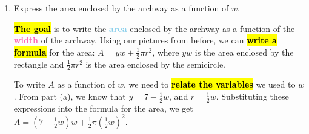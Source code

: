 \documentclass{article}
\newcommand{\goal}[1]{\textbf{\textcolor{skyblue}{#1}}}
\newcommand{\indvar}[1]{\textbf{\textcolor{hotpink}{#1}}}
\begin{document}
\begin{enumerate}
\begin{enumerate}
\begin{solution}
      Now let's \hl{\textbf{write a formula}} for the height of the side wall, \hl{\textbf{defining any variables we use.}}
       \begin{center}
      \end{center}
     Let's use $r$ to represent the height from the bottom of the semicircle to the top of the semicircle and $h$
     to represent the total height of the archway. Then $y=h-r$. 
     
     To write $y$ as a function of $w$, we need to \hl{\textbf{relate the variables}} using \hl{\textbf{information we know}} about the situation. We know that the
     total height of the archway is 7 meters, so $h=7$. Also, we can see that $r$ is the radius of the semicircle
     and $w$ is the diameter, which means that $r=\frac{1}{2}w$. We can substitute these expressions for $h$ and $r$
     to get $y=\boxed{7-\frac{1}{2}w}$. 
    \end{solution}

    

    

  \item
    \begin{problem}[\vfill]
      Express the area enclosed by the archway as a function of $w$.
    \end{problem}

    \begin{solution}
      \hl{\textbf{The goal}} is to write the \goal{area} enclosed by the archway as a function of the \indvar{width}
      of the archway. Using our pictures from before, we can \hl{\textbf{write a formula}} for the area:
      $A = yw + \frac{1}{2}\pi r^2$, where $yw$ is the area enclosed by the rectangle and $\frac{1}{2}\pi r^2$ is the 
      area enclosed by the semicircle.

      To write $A$ as a function of $w$, we need to \hl{\textbf{relate the variables}} we used to $w$. From part (a),
      we know that $y=7-\frac{1}{2}w$, and $r = \frac{1}{2}w$. Substituting these expressions into the formula
      for the area, we get
      $A = \boxed{(7-\tfrac{1}{2}w)w + \frac{1}{2} \pi (\tfrac{1}{2}w)^2}$.
    \end{solution}


\end{enumerate}
\end{enumerate}
\end{document}
